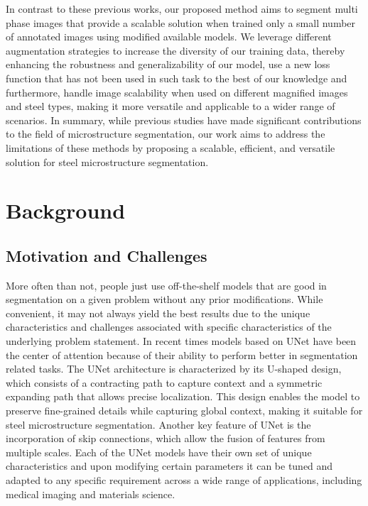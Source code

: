 \documentclass[]{article}
\begin{document}
In contrast to these previous works, our proposed method aims to segment multi phase images that provide a scalable solution when trained only a small number of annotated images using modified available models. We leverage different augmentation strategies to increase the diversity of our training data, thereby enhancing the robustness and generalizability of our model, use a new loss function that has not been used in such task to the best of our knowledge and furthermore, handle image scalability when used on different magnified images and steel types, making it more versatile and applicable to a wider range of scenarios. In summary, while previous studies have made significant contributions to the field of microstructure segmentation, our work aims to address the limitations of these methods by proposing a scalable, efficient, and versatile solution for steel microstructure segmentation.


\section{Background}

\subsection{Motivation and Challenges}
More often than not, people just use off-the-shelf models that are good in segmentation on a given problem without any prior modifications. While convenient, it may not always yield the best results due to the unique characteristics and challenges associated with specific characteristics of the underlying problem statement. In recent times models based on UNet have been the center of attention because of their ability to perform better in segmentation related tasks. The UNet architecture is characterized by its U-shaped design, which consists of a contracting path to capture context and a symmetric expanding path that allows precise localization. This design enables the model to preserve fine-grained details while capturing global context, making it suitable for steel microstructure segmentation. Another key feature of UNet is the incorporation of skip connections, which allow the fusion of features from multiple scales. Each of the UNet models have their own set of unique characteristics and upon modifying certain parameters it can be tuned and adapted to any specific requirement across a wide range of applications, including medical imaging and materials science.
\end{document}
